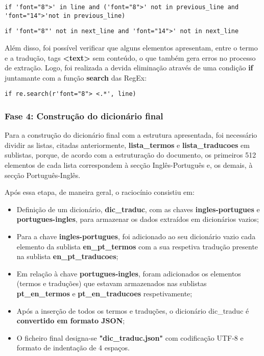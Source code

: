 \begin{lstlisting}[style=pythonstyle]
if 'font="8">' in line and ('font="8">' not in previous_line and 'font="14">'not in previous_line)
\end{lstlisting}

\begin{lstlisting}[style=pythonstyle]
if 'font="8"' not in next_line and 'font="14">' not in next_line
\end{lstlisting}

Além disso, foi possível verificar que alguns elementos apresentam, entre o termo e a tradução, tags \textbf{<text>} sem conteúdo, o que também gera erros no processo de extração. Logo, foi realizada a devida eliminação através de uma condição \textbf{if} juntamante com a função \textbf{search} das RegEx:

\begin{lstlisting}[style=pythonstyle]
if re.search(r'font="8"> <.*', line)
\end{lstlisting}

\subsubsection{Fase 4: Construção do dicionário final}

Para a construção do dicionário final com a estrutura apresentada, foi necessário dividir as listas, citadas anteriormente, \textbf{lista\_termos} e \textbf{lista\_traducoes} em sublistas, porque, de acordo com a estruturação do documento, os primeiros 512 elementos de cada lista correspondem à secção Inglês-Português e, os demais, à secção Português-Inglês.

Após essa etapa, de maneira geral, o raciocínio consistiu em:

\begin{itemize}

    \item Definição de um dicionário, \textbf{dic\_traduc}, com as chaves \textbf{ingles-portugues} e \textbf{portugues-ingles}, para armazenar os dados extraídos em dicionários vazios;

    \item Para a chave \textbf{ingles-portugues}, foi adicionado ao seu dicionário vazio cada elemento da sublista \textbf{en\_pt\_termos} com a sua respetiva tradução presente na sublista \textbf{en\_pt\_traducoes};

    \item Em relação à chave \textbf{portugues-ingles}, foram adicionados os elementos (termos e traduções) que estavam armazenados nas sublistas \textbf{pt\_en\_termos} e \textbf{pt\_en\_traducoes} respetivamente;

    \item Após a inserção de todos os termos e traduções, o dicionário dic\_traduc é \textbf{convertido em formato JSON};

    \item O ficheiro final designa-se \textbf{"dic\_traduc.json"} com codificação UTF-8 e formato de indentação de 4 espaços.

\end{itemize}

